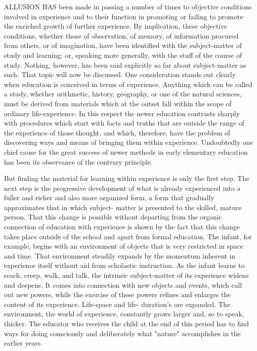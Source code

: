 ALLUSION HAS been made in passing a number of times to objective conditions 
involved in experience and to their function in promoting or failing to promote the 
enriched growth of further experience. By implication, these objective conditions, 
whether those of observation, of memory, of information procured from others, or of 
imagination, have been identified with the subject-matter of study and learning; or, 
speaking more generally, with the stuff of the course of study. Nothing, however, has 
been said explicitly so far about subject-matter as such. That topic will now be discussed. 
One consideration stands out clearly when education is conceived in terms of experience. 
Anything which can be called a study, whether arithmetic, history, geography, or one of 
the natural sciences, must be derived from materials which at the outset fall within the 
scope of ordinary life-experience. In this respect the newer education contrasts sharply 
with procedures which start with facts and truths that are outside the range of the 
experience of those thought, and which, therefore, have the problem of discovering ways 
and means of bringing them within experience. Undoubtedly one chief cause for the great 
success of newer methods in early elementary education has been its observance of the 
contrary principle. 

But finding the material for learning within experience is only the first step. The next 
step is the progressive development of what is already experienced into a fuller and richer 
and also more organized form, a form that gradually approximates that in which subject- 
matter is presented to the skilled, mature person. That this change is possible without 
departing from the organic connection of education with experience is shown by the fact 
that this change takes place outside of the school and apart from formal education. The 
infant, for example, begins with an environment of objects that is very restricted in space 
and time. That environment steadily expands by the momentum inherent in experience 
itself without aid from scholastic instruction. As the infant learns to reach, creep, walk, 
and talk, the intrinsic subject-matter of its experience widens and deepens. It comes into 
connection with new objects and events, which call out new powers, while the exercise of 
these powers refines and enlarges the content of its experience. Life-space and life- 
duration’s are expanded. The environment, the world of experience, constantly grows 
larger and, so to speak, thicker. The educator who receives the child at the end of this 
period has to find ways for doing consciously and deliberately what "nature" 
accomplishes in the earlier years. 



